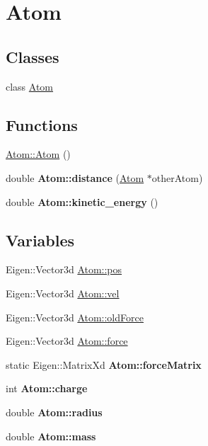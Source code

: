 \hypertarget{group___atom}{}\section{Atom}
\label{group___atom}
\subsection*{Classes}
\begin{DoxyCompactItemize}
\item 
class \mbox{\hyperlink{class_atom}{Atom}}
\end{DoxyCompactItemize}
\subsection*{Functions}
\begin{DoxyCompactItemize}
\item 
\mbox{\hyperlink{group___atom_gaa0147d7e49ab90f559b66e38d3d12863}{Atom\+::\+Atom}} ()
\item 
\mbox{\label{group___atom_ga90a4da89f562cb57f576078e5580a0a8}} 
double {\bfseries Atom\+::distance} (\mbox{\hyperlink{class_atom}{Atom}} $\ast$other\+Atom)
\item 
\mbox{\label{group___atom_ga4cc117bd6f7a2ce6f1af407283aff4b2}} 
double {\bfseries Atom\+::kinetic\+\_\+energy} ()
\end{DoxyCompactItemize}
\subsection*{Variables}
\begin{DoxyCompactItemize}
\item 
Eigen\+::\+Vector3d \mbox{\hyperlink{group___atom_ga9c44a53717ca3857065c0a36787359e1}{Atom\+::pos}}
\item 
Eigen\+::\+Vector3d \mbox{\hyperlink{group___atom_gaabc1e87e4ed861ae02f781d3f43d8481}{Atom\+::vel}}
\item 
Eigen\+::\+Vector3d \mbox{\hyperlink{group___atom_gaf5b2daf8c6f32465b0ab1aecab57915b}{Atom\+::old\+Force}}
\item 
Eigen\+::\+Vector3d \mbox{\hyperlink{group___atom_ga33b530b8900b57bfa933ae79c7e95d71}{Atom\+::force}}
\item 
\mbox{\label{group___atom_ga8fadf04e83f1558c13192f91eee5348a}} 
static Eigen\+::\+Matrix\+Xd {\bfseries Atom\+::force\+Matrix}
\item 
\mbox{\label{group___atom_ga482b093515f1ad043b35646669445bda}} 
int {\bfseries Atom\+::charge}
\item 
\mbox{\label{group___atom_ga3f68fa5a0bd341c3c6b73826da8e9302}} 
double {\bfseries Atom\+::radius}
\item 
\mbox{\label{group___atom_ga90e6f00ca3ae2fda9b87cb27aac5929d}} 
double {\bfseries Atom\+::mass}
\end{DoxyCompactItemize}


